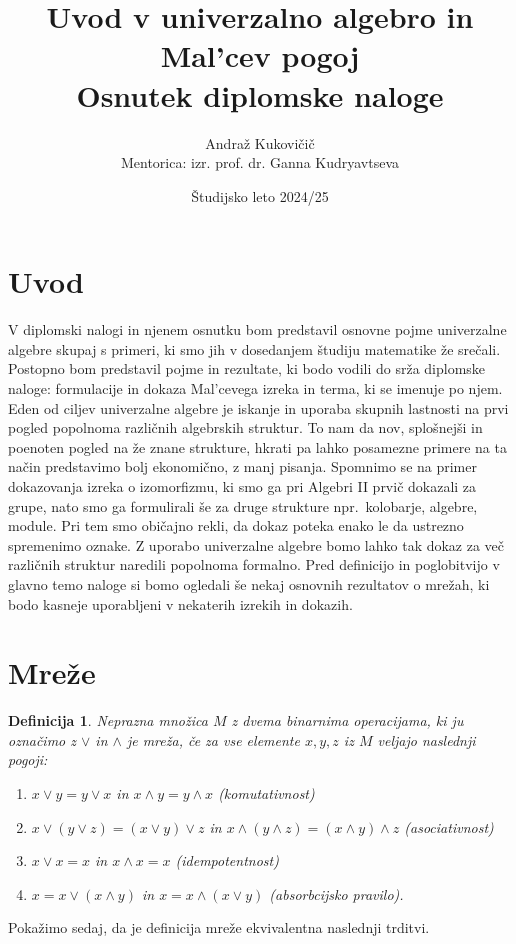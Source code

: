 \documentclass[a4paper,11pt]{article}
\title{Uvod v univerzalno algebro in Mal'cev pogoj \\ 
\Large Osnutek diplomske naloge}
\author{Andraž Kukovičič \\
Mentorica: izr. prof. dr. Ganna Kudryavtseva}
\date{Študijsko leto 2024/25}
\newtheorem{definicija}{Definicija}
\begin{document}


\maketitle

\section{Uvod}
V diplomski nalogi in njenem osnutku bom predstavil osnovne pojme univerzalne algebre skupaj s primeri, 
ki smo jih v dosedanjem študiju matematike že srečali. 
Postopno bom predstavil pojme in rezultate, ki bodo vodili do srža diplomske naloge:
formulacije in dokaza Mal'cevega izreka in terma, ki se imenuje po njem.
Eden od ciljev univerzalne algebre je iskanje in uporaba skupnih lastnosti na prvi pogled popolnoma
različnih algebrskih struktur. To nam da nov, splošnejši in poenoten pogled na že znane strukture, hkrati pa lahko 
posamezne primere na ta način predstavimo bolj ekonomično, z manj pisanja. 
Spomnimo se na primer dokazovanja izreka o izomorfizmu, ki smo ga pri Algebri II prvič dokazali za grupe, nato 
smo ga formulirali še za druge strukture npr.\ kolobarje, algebre, module. Pri tem smo običajno rekli, da dokaz poteka 
enako le da ustrezno spremenimo oznake. Z uporabo univerzalne algebre bomo lahko tak dokaz za več različnih struktur 
naredili popolnoma formalno. 
Pred definicijo in poglobitvijo v glavno temo naloge si bomo ogledali še nekaj osnovnih rezultatov o mrežah, ki bodo 
kasneje uporabljeni v nekaterih izrekih in dokazih.

\section{Mreže}
\begin{definicija}
    Neprazna množica $M$ z dvema binarnima operacijama, ki ju označimo z $\vee$ in $\wedge$ je \emph{mreža}, če 
za vse elemente $x, y, z$ iz $M$ veljajo naslednji pogoji:\\
\begin{enumerate} 
    \item[$M1$] $x \vee y = y \vee x$ in $x \wedge y = y \wedge x$ (komutativnost)
    \item[$M2$] $x\vee \left(y \vee z\right) = \left(x \vee y\right)\vee z$ in 
    $x \wedge \left(y \wedge z\right) = \left(x \wedge y\right)\wedge z$ (asociativnost)
    \item[$M3$] $x \vee x = x$ in $x \wedge x = x$ (idempotentnost)
    \item[$M4$] $x = x \vee \left(x \wedge y\right)$ in $x = x \wedge \left(x \vee y\right)$ (absorbcijsko pravilo).\\
\end{enumerate}
\end{definicija}
Pokažimo sedaj, da je definicija mreže ekvivalentna naslednji trditvi.
\end{document}
